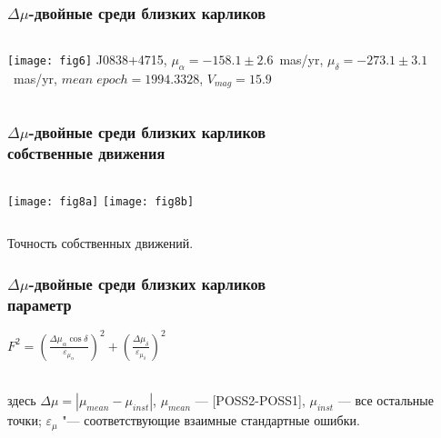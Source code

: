 \begin{frame}%
\frametitle{$\Delta\mu$-двойные среди близких карликов}
\begin{columns}
	\texttt{[image: fig6]}
	{\footnotesize
		J0838+4715, $\mu_{\alpha}=-158.1\pm2.6$~mas/yr, $\mu_{\delta}=-273.1\pm3.1$~mas/yr, $mean\;epoch = 1994.3328$, $V_{mag}=15.9$
	}
\end{columns}
\end{frame}

\begin{frame}%
\frametitle{$\Delta\mu$-двойные среди близких карликов\\{\small собственные движения}}
\begin{center}
\begin{columns}
	\texttt{[image: fig8a]}
	\texttt{[image: fig8b]}
\end{columns}
\end{center}
{\footnotesize Точность собственных движений.}
\end{frame}



\begin{frame}
\frametitle{$\Delta\mu$-двойные среди близких карликов\\{\small параметр}}
\begin{center}
$F^2=\left(\frac{\Delta\mu_\alpha\cos\delta}{\varepsilon_{\mu_\alpha}}\right)^2 + \left(\frac{\Delta\mu_\delta}{\varepsilon_{\mu_\delta}}\right)^2$\\ \\
\end{center}
{\footnotesize
здесь $\Delta\mu = |\mu_{mean}-\mu_{inst}|$,  $\mu_{mean}$ --- [POSS2-POSS1], $\mu_{inst}$ --- все остальные точки; $\varepsilon_{\mu}$ "--- соответствующие взаимные стандартные ошибки.
}
\end{frame}

